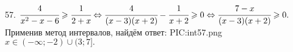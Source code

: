57. $\cfrac{4}{x^2-x-6}\geqslant\cfrac{1}{2+x}\Leftrightarrow\cfrac{4}{(x-3)(x+2)}-\cfrac{1}{x+2}\geqslant0\Leftrightarrow
\cfrac{7-x}{(x-3)(x+2)}\geqslant0.$ Применив метод интервалов, найдём ответ:
{{PIC:int57.png}}
$x\in(-\infty;-2)\cup(3;7].$\\
